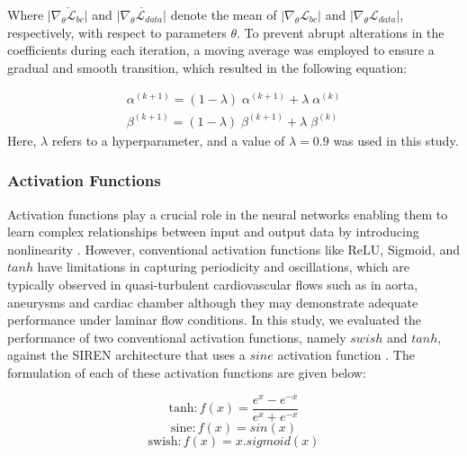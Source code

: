 \documentclass[times,twocolumn,final]{elsarticle}
\begin{document}
{Where $\overline{|\nabla_\theta\mathcal{L}_{bc}|}$ and $\overline{|\nabla_\theta\mathcal{L}_{data}|}$ denote the mean of $|\nabla_\theta\mathcal{L}_{bc}|$ and $|\nabla_\theta\mathcal{L}_{data}|$, respectively, with respect to parameters $\theta$. To prevent abrupt alterations in the coefficients during each iteration, a moving average was employed to ensure a gradual and smooth transition, which resulted in the following equation: 

\begin{equation}
\begin{split}
\alpha^{(k+1)} = (1-\lambda)\;\alpha^{(k+1)} + \lambda\;\alpha^{(k)}
\\[5pt]
\beta^{(k+1)} = (1-\lambda)\;\beta^{(k+1)} + \lambda\;\beta^{(k)}
\end{split}
\end{equation}
Here, $\lambda$ refers to a hyperparameter, and a value of $\lambda=0.9$ was used in this study. 

\subsubsection{Activation Functions}
Activation functions play a crucial role in the neural networks enabling them to learn complex relationships between input and output data by introducing nonlinearity \citep{Jagtap2023_PINNs}. However, conventional activation functions like ReLU, Sigmoid, and $tanh$ have limitations in capturing periodicity and oscillations, which are typically observed in quasi-turbulent cardiovascular flows such as in aorta, aneurysms and cardiac chamber although they may demonstrate adequate performance under laminar flow conditions. In this study, we evaluated the performance of two conventional activation functions, namely $swish$ and $tanh$, against the SIREN architecture that uses a $sine$ activation function \citep{Sitzmann2020_PINNs}. The formulation of each of these activation functions are given below:

\begin{equation}
\text{tanh}: f(x)=\frac{e^x-e^{-x}}{e^x+e^{-x}}
\end{equation}
\begin{equation}
\text{sine}: f(x)=sin(x)
\end{equation}
\begin{equation}
\text{swish}: f(x) = x.sigmoid(x)
\end{equation}


}
\end{document}
